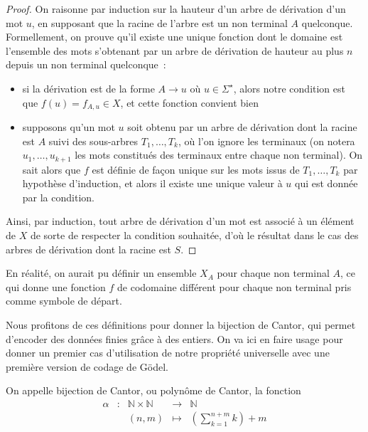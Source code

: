 \begin{proof}
  On raisonne par induction sur la hauteur d'un arbre de dérivation d'un mot
  $u$, en supposant que la racine de l'arbre est un non terminal $A$
  quelconque. Formellement, on prouve qu'il existe une unique fonction dont
  le domaine est l'ensemble des mots s'obtenant par un arbre de dérivation de
  hauteur au plus $n$ depuis un non terminal quelconque~:
  \begin{itemize}
  \item si la dérivation est de la forme $A \to u$ où $u\in\Sigma^\star$, alors
    notre condition est que $f(u) = f_{A,u} \in X$, et cette fonction convient
    bien
  \item supposons qu'un mot $u$ soit obtenu par un arbre de dérivation dont la
    racine est $A$ suivi des sous-arbres $T_1,\ldots,T_k$, où l'on ignore les
    terminaux (on notera $u_1,\ldots,u_{k+1}$ les mots constitués des terminaux
    entre chaque non terminal). On sait alors que $f$ est définie de façon
    unique sur les mots issus de $T_1,\ldots,T_k$ par hypothèse d'induction, et
    alors il existe une unique valeur à $u$ qui est donnée par la condition.
  \end{itemize}

  Ainsi, par induction, tout arbre de dérivation d'un mot est associé à un
  élément de $X$ de sorte de respecter la condition souhaitée, d'où le
  résultat dans le cas des arbres de dérivation dont la racine est $S$.
\end{proof}

\begin{remark}
  En réalité, on aurait pu définir un ensemble $X_A$ pour chaque non terminal
  $A$, ce qui donne une fonction $f$ de codomaine différent pour chaque
  non terminal pris comme symbole de départ.
\end{remark}

Nous profitons de ces définitions pour donner la bijection de Cantor, qui
permet d'encoder des données finies grâce à des entiers. On va ici en faire
usage pour donner un premier cas d'utilisation de notre propriété universelle
avec une première version de codage de Gödel.

\begin{definition}\label{def.bij.Cantor}
  On appelle bijection de Cantor, ou polynôme de Cantor, la fonction
  \[\begin{array}{ccccc}
  \alpha & : & \mathbb N \times \mathbb N & \longrightarrow & \mathbb N\\
  & & (n,m) & \displaystyle\longmapsto &
  \displaystyle\left(\sum_{k = 1}^{n+m} k\right)+m
  \end{array}\]
\end{definition}


